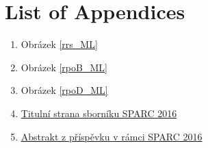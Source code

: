 \chapter*{List of Appendices}

\begin{enumerate}
\item Obrázek \ref{rrs_ML}
\item Obrázek \ref{rpoB_ML}
\item Obrázek \ref{rpoD_ML}
\item \hyperlink{SPARC.1}{Titulní strana sborníku SPARC 2016}
\item \hyperlink{SPARC.55}{Abstrakt z příspěvku v rámci SPARC 2016}
\end{enumerate}

%

%

